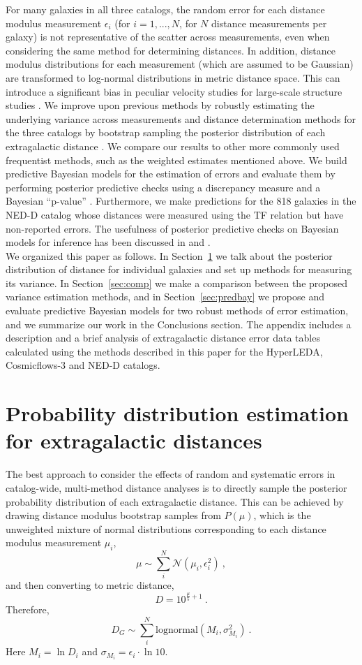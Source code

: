 \documentclass[a4paper,fleqn,usenatbib]{mnras}
\begin{document}
For many galaxies in all three catalogs, the random error for each distance modulus measurement $\epsilon_i$ (for $i=1,...,N$, for $N$ distance measurements per galaxy) is not representative of the scatter across measurements, even when considering the same method for determining distances. In addition, distance modulus distributions for each measurement (which are assumed to be Gaussian) are transformed to log-normal distributions in metric distance space. This can introduce a significant bias in peculiar velocity studies for large-scale structure studies \citep{lognormal}. We improve upon previous methods by robustly estimating the underlying variance across measurements and distance determination methods for the three catalogs by bootstrap sampling the posterior distribution of each extragalactic distance \citep{chaparro18}. We compare our results to other more commonly used frequentist methods, such as the weighted estimates mentioned above. We build predictive Bayesian models for the estimation of errors and evaluate them by performing posterior predictive checks using a discrepancy measure and a Bayesian ``p-value'' \citep{gelmanppd}. Furthermore, we make predictions for the 818 galaxies in the NED-D catalog whose distances were measured using the TF relation but have non-reported errors. The usefulness of posterior predictive checks on Bayesian models for inference has been discussed in \citet{gelman2003} and \citet{ppcinf}.\\

We organized this paper as follows. In Section~\ref{sec:post} we talk about the posterior distribution of distance for individual galaxies and set up methods for measuring its variance. In Section~\ref{sec:comp} we make a comparison between the proposed variance estimation methods, and in Section~\ref{sec:predbay} we propose and evaluate predictive Bayesian models for two robust methods of error estimation, and we summarize our work in the Conclusions section. The appendix includes a description and a brief analysis of extragalactic distance error data tables calculated using the methods described in this paper for the HyperLEDA, Cosmicflows-3 and NED-D catalogs.

\section{Probability distribution estimation for extragalactic distances}
\label{sec:post} 
 
The best approach to consider the effects of random and systematic errors in catalog-wide, multi-method distance analyses is to directly sample the posterior probability distribution of each extragalactic distance. This can be achieved by drawing distance modulus bootstrap samples from $P(\mu)$, which is the unweighted mixture of normal distributions corresponding to each distance modulus measurement $\mu_i$,
\[\mu\sim\sum_i^N \mathcal{N}(\mu_i,\epsilon_i^2)\ ,\]
and then converting to metric distance,
\[D=10^{\frac{\mu}{5}+1}\ .\]
Therefore,
\[D_G\sim\sum_i^N\mathrm{lognormal}(M_i,\sigma_{M_i}^2)\ .\]
Here $M_i=\ln D_i$ and $\sigma_{M_i}=\epsilon_i\cdot\ln10$.\\
\end{document}
